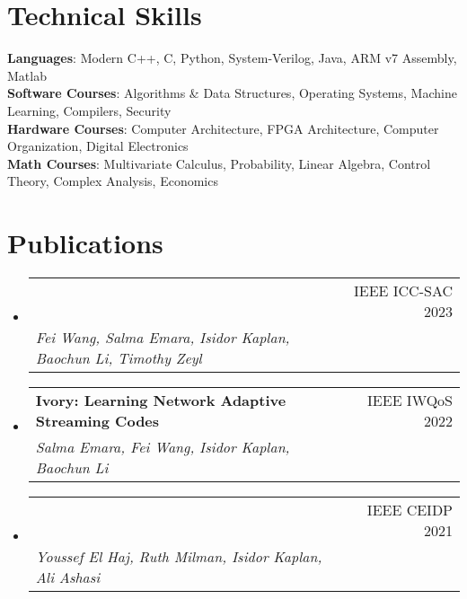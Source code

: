 \documentclass[letterpaper,11pt]{article}
\makeatletter
\newcommand{\resumeSubheading}[4]{
  \vspace{-2pt}\item
    \begin{tabular*}{0.97\textwidth}[t]{l@{\extracolsep{\fill}}r}
      \textbf{#1} & #2 \\
      \textit{\small#3} & \textit{\small #4} \\
    \end{tabular*}\vspace{-7pt}
}
\newcommand{\resumeSubHeadingListStart}{\begin{itemize}[leftmargin=0.15in, label={}]}
\newcommand{\resumeSubHeadingListEnd}{\end{itemize}}
\makeatother
\begin{document}
 \section{Technical Skills}
  \begin{itemize}[leftmargin=0.15in, label={}]
     \small{\item{
      \textbf{Languages}{: Modern C++, C, Python, System-Verilog, Java, ARM v7 Assembly, Matlab} \\
      \textbf{Software Courses}{: Algorithms \& Data Structures, Operating Systems, Machine Learning, Compilers, Security} \\
      \textbf{Hardware Courses}{: Computer Architecture, FPGA Architecture, Computer Organization, Digital Electronics} \\
      \textbf{Math Courses}{: Multivariate Calculus, Probability, Linear Algebra, Control Theory, Complex Analysis, Economics } \\
     }}
  \end{itemize}

\section{Publications}
  \resumeSubHeadingListStart
    \resumeSubheading
      {\parbox[t]{12cm}{Multi-Agent Deep Reinforcement Learning for Cooperative Edge Caching via Hybrid Communication}}{IEEE ICC-SAC 2023}
      {Fei Wang, Salma Emara, Isidor Kaplan, Baochun Li, Timothy Zeyl}{}
    \resumeSubheading
      {Ivory: Learning Network Adaptive Streaming Codes}{IEEE IWQoS 2022}
      {Salma Emara, Fei Wang, Isidor Kaplan, Baochun Li}{}
    \resumeSubheading
      {\parbox[t]{13cm}{Hybrid Algorithm Based on Machine Learning and Deep Learning to Identify Ceramic Insulators and Detect Physical Damages}}{IEEE CEIDP 2021}
      {Youssef El Haj, Ruth Milman, Isidor Kaplan, Ali Ashasi}{}
  \resumeSubHeadingListEnd
\end{document}
